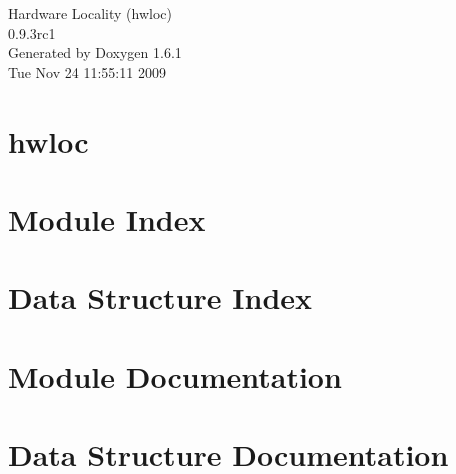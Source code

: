 \documentclass[a4paper]{book}
\begin{document}
\hypersetup{pageanchor=false}
\begin{titlepage}
\vspace*{7cm}
\begin{center}
{\Large Hardware Locality (hwloc) \\[1ex]\large 0.9.3rc1 }\\
\vspace*{1cm}
{\large Generated by Doxygen 1.6.1}\\
\vspace*{0.5cm}
{\small Tue Nov 24 11:55:11 2009}\\
\end{center}
\end{titlepage}
\clearemptydoublepage
{}
\tableofcontents
\clearemptydoublepage
{}
\hypersetup{pageanchor=true}
\chapter{hwloc}
\label{index}\hypertarget{index}{}
\chapter{Module Index}

\chapter{Data Structure Index}

\chapter{Module Documentation}
























\chapter{Data Structure Documentation}






\printindex
\end{document}
